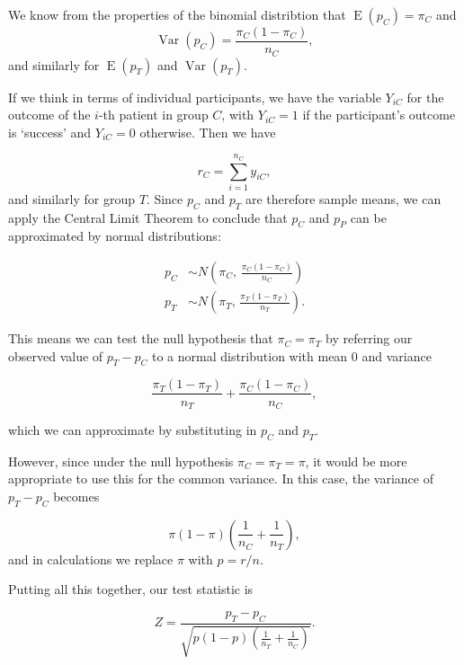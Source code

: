 \documentclass[
  openany]{book}
\theoremstyle{definition}
\theoremstyle{definition}
\theoremstyle{definition}
\theoremstyle{definition}
\theoremstyle{remark}
\begin{document}
We know from the properties of the binomial distribtion that \(\operatorname{E}\left(p_C\right) = \pi_C\) and
\[\operatorname{Var}\left(p_C\right) = \frac{\pi_C\left(1-\pi_C\right)}{n_C},\]
and similarly for \(\operatorname{E}\left(p_T\right)\) and \(\operatorname{Var}\left(p_T\right)\).

If we think in terms of individual participants, we have the variable \(Y_{iC}\) for the outcome of the \(i\)-th patient in group \(C\), with \(Y_{iC}=1\) if the participant's outcome is `success' and \(Y_{iC}=0\) otherwise. Then we have

\[r_C = \sum\limits_{i=1}^{n_C} y_{iC},\]
and similarly for group \(T\). Since \(p_C\) and \(p_T\) are therefore sample means, we can apply the Central Limit Theorem to conclude that \(p_C\) and \(p_P\) can be approximated by normal distributions:

\[
\begin{aligned}
p_C & \sim N\left(\pi_C,\, \frac{\pi_C\left(1-\pi_C\right)}{n_C}\right)\\
p_T & \sim N\left(\pi_T,\, \frac{\pi_T\left(1-\pi_T\right)}{n_T}\right).
\end{aligned}
\]

This means we can test the null hypothesis that \(\pi_C = \pi_T\) by referring our observed value of \(p_T - p_C\) to a normal distribution with mean 0 and variance

\[ \frac{\pi_T\left(1-\pi_T\right)}{n_T} + \frac{\pi_C\left(1-\pi_C\right)}{n_C},\]

which we can approximate by substituting in \(p_C\) and \(p_T\).

However, since under the null hypothesis \(\pi_C = \pi_T = \pi\), it would be more appropriate to use this for the common variance. In this case, the variance of \(p_T - p_C\) becomes

\[\pi\left(1-\pi\right)\left(\frac{1}{n_C} + \frac{1}{n_T}\right), \]
and in calculations we replace \(\pi\) with \(p = r/n\).

Putting all this together, our test statistic is

\[Z = \frac{p_T - p_C}{\sqrt{p\left(1-p\right)\left(\frac{1}{n_T} + \frac{1}{n_C}\right)}}.\]
\end{document}
